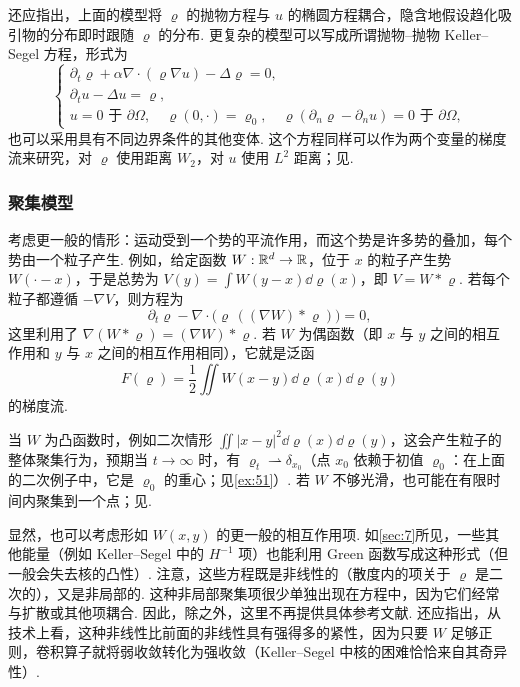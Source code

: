 还应指出，上面的模型将 $\varrho$ 的抛物方程与 $u$ 的椭圆方程耦合，隐含地假设趋化吸引物的分布即时跟随 $\varrho$ 的分布. 更复杂的模型可以写成所谓抛物--抛物 Keller--Segel 方程，形式为
\[
\begin{cases}
\partial_t\varrho+\alpha\nabla\cdot(\varrho\nabla u)-\Delta\varrho=0,\\
\partial_tu-\Delta u=\varrho,\\
u=0\text{ 于 }\partial\Omega,\quad\varrho(0,\cdot)=\varrho_0,
\quad\varrho(\partial_n\varrho-\partial_n u)=0\text{ 于 }\partial\Omega,
\end{cases}
\]
也可以采用具有不同边界条件的其他变体. 这个方程同样可以作为两个变量的梯度流来研究，对 $\varrho$ 使用距离 $W_2$，对 $u$ 使用 $L^2$ 距离；见\cite{b58}.

\subsubsection*{聚集模型}
\label{idx:i79-p307}
考虑更一般的情形：运动受到一个势的平流作用，而这个势是许多势的叠加，每个势由一个粒子产生. 例如，给定函数 $W:\mathbb R^d\to\mathbb R$，位于 $x$ 的粒子产生势 $W(\cdot-x)$，于是总势为 $V(y)=\int W(y-x)\dd\varrho(x)$，即 $V=W*\varrho$. 若每个粒子都遵循 $-\nabla V$，则方程为
\[
\partial_t\varrho-\nabla\cdot\bigl(\varrho\,((\nabla W)*\varrho)\bigr)=0,
\]
这里利用了 $\nabla(W*\varrho)=(\nabla W)*\varrho$. 若 $W$ 为偶函数（即 $x$ 与 $y$ 之间的相互作用和 $y$ 与 $x$ 之间的相互作用相同），它就是泛函
\[
F(\varrho)=\frac12\iint W(x-y)\dd\varrho(x)\dd\varrho(y)
\]
的梯度流.

当 $W$ 为凸函数时，例如二次情形 $\iint|x-y|^2\dd\varrho(x)\dd\varrho(y)$，这会产生粒子的整体聚集行为，预期当 $t\to\infty$ 时，有 $\varrho_t\rightharpoonup\delta_{x_0}$（点 $x_0$ 依赖于初值 $\varrho_0$：在上面的二次例子中，它是 $\varrho_0$ 的重心；见\autoref{ex:51}）. 若 $W$ 不够光滑，也可能在有限时间内聚集到一个点；见\cite{b118}.

显然，也可以考虑形如 $W(x,y)$ 的更一般的相互作用项. 如\autoref{sec:7}所见，一些其他能量（例如 Keller--Segel 中的 $H^{-1}$ 项）也能利用 Green 函数写成这种形式（但一般会失去核的凸性）. 注意，这些方程既是非线性的（散度内的项关于 $\varrho$ 是二次的），又是非局部的. 这种非局部聚集项很少单独出现在方程中，因为它们经常与扩散或其他项耦合. 因此，除\cite{b118}之外，这里不再提供具体参考文献. 还应指出，从技术上看，这种非线性比前面的非线性具有强得多的紧性，因为只要 $W$ 足够正则，卷积算子就将弱收敛转化为强收敛（Keller--Segel 中核的困难恰恰来自其奇异性）.

